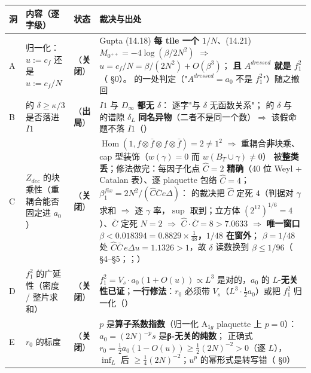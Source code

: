 \begin{center}
\footnotesize
\setlength{\tabcolsep}{4pt}
\begin{tabularx}{\textwidth}{@{}p{} L{0.19\textwidth} L{0.145\textwidth} L{0.545\textwidth}@{}}
\toprule
洞 & 内容（逐字级） & 状态 & 裁决与出处 \\
\midrule
A & 归一化：$u:=c_f$ 还是 $u:=c_f/N$ & \LT{}（\textbf{关闭}） &
Gupta (14.18) \textbf{每 tile 一个 $1/N$}、(14.21) $M_{0^{++}}=-4\log(\beta/2N^2)$ $\Rightarrow$ $u=c_f/N=\beta/(2N^2)+O(\beta^3)$；
\textbf{且 $A^{dressed}$ 就是 $f_1^2$}（ \S0）。 的一处判定（"$A^{dressed}=a_0$ 不是 $f_1^2$"）随之撤回 \\
B &  的 $\delta\ge\kappa/3$ 是否落进 $I1$ & \LN{}（\textbf{出局}） &
$I1$ 与 $D_\infty$ \textbf{都无 $\delta$}： 逐字"与 $\delta$ 无函数关系"； 的 $\delta$ 与  的谱隙 $\delta_L$
\textbf{同名异物}（二者不是同一个数）$\Rightarrow$ 该假命题不落 $I1$（） \\
C & $Z_{dec}$ 的块乘性（重耦合能否固定进 $a_0$） & \LT{}（\textbf{关闭}） &
$\operatorname{Hom}(1,f\otimes\bar f\otimes f\otimes\bar f)=2\neq1^2$ $\Rightarrow$ 重耦合\textbf{非}块乘、cap 型装饰（$w(\gamma)=0$ 而 $w(B_T\cup\gamma)\neq0$）
被\textbf{整类丢}；修法做完：每因子化点 $\hat C=2$ \textbf{精确}（40 位 Weyl + Catalan 表）、逐 plaquette 包络 $\hat C=4$；
$\beta_1^{fix}=2N^2/(\hat C\bar Ce\Delta)$： 的裁决把 $\hat C$ 定死 $4$（判据对 $\gamma$ 求和 $\Rightarrow$ 逐 $\gamma$ 率，$\sup$ 取到；立方体 $(2^{12})^{1/6}=4$）、$\bar C$ 定死 $N=2$
$\Rightarrow$ $\hat C\cdot\bar C=8>7.0633$ $\Rightarrow$ \textbf{唯一窗口 $\beta<0.018394=0.8829\times\tfrac1{48}$，$1/48$ 在窗外}；
$\beta=1/48$ 处 $\hat C\bar C\,e\Delta u=1.1326>1$，故 $\delta$ 读数换到 $\beta\le1/96$（ \S4--\S5；；） \\
D & $f_1^2$ 的广延性（密度 / 整片求和） & \LT{}（\textbf{关闭}） &
$f_1^2=V_s\cdot a_0(1+O(u))\propto L^3$ 是对的，$a_0$ 的 $L$-\textbf{无关性已证}；\textbf{一行修法}：$r_0$ 必须带 $V_s$（$L^3\cdot\tfrac12a_0$）或把 $f_1^2$ 归一化（） \\
E & $r_0$ 的标度 & \LT{}（\textbf{关闭}） &
$p$ 是\textbf{算子系数指数}（归一化 $\mathrm{A}_{1g}$ plaquette 上 $p=0$）：$a_0=(2N)^{-p}s$ 是\textbf{β-无关的纯数}；
正确式 $r_0=\tfrac12a_0(1-O(u))\ge\tfrac12(2N)^{-2}>0$（逐 $L$），$\inf_L$ 后 $\ge\tfrac14(2N)^{-2}$；$u^p$ 的幂形式是转写错（ \S0） \\
\bottomrule
\end{tabularx}
\end{center}


